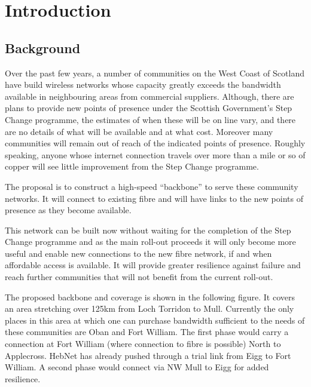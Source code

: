 \section{Introduction}

\subsection{Background}
Over the past few years, a number of communities on the West Coast of
Scotland have build wireless networks whose capacity greatly exceeds the 
bandwidth available in neighbouring areas from commercial suppliers.
Although, there are plans to provide new points of presence under the
Scottish Government's Step Change programme, the estimates of when
these will be on line vary, and there are no details of what will be
available and at what cost.  Moreover many communities will remain out
of reach of the indicated points of presence. Roughly speaking, anyone
whose internet connection travels over more than a mile or so of
copper will see little improvement from the Step Change programme.

The proposal is to construct a high-speed ``backbone'' to serve these
community networks. It will connect to existing fibre and will have
links to the new points of presence as they become available.

This network can be built now without waiting for the completion of
the Step Change programme and as the main roll-out proceeds it will
only become more useful and enable new connections to the new fibre
network, if and when affordable access is available.  It will provide
greater resilience against failure and reach further communities that
will not benefit from the current roll-out.

The proposed backbone and coverage is shown in the following figure.
It covers an area stretching over 125km from Loch Torridon to Mull.
Currently the only places in this area at which one can purchase
bandwidth sufficient to the needs of these communities are Oban and
Fort William.
The first phase would carry a  connection at Fort William (where
connection to fibre is possible) North to Applecross. HebNet has
already pushed through a trial link from Eigg to Fort William.  A
second phase would connect via NW Mull to Eigg for added resilience.  

